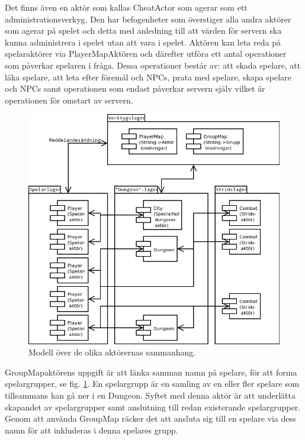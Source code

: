 \documentclass[a4paper]{article}
\begin{document}
Det finns även en aktör som kallas CheatActor som agerar som ett administrationsverkyg. Den har befogenheter som överstiger alla andra aktörer som agerar på spelet och detta med anledning till att värden för servern ska kunna administrera i spelet utan att vara i spelet. Aktören kan leta reda på spelaraktörer via PlayerMapAktören och därefter utföra ett antal operationer som påverkar spelaren i fråga. Dessa operationer består av: att skada spelare, att läka spelare, att leta efter föremål och NPCs, prata med spelare, skapa spelare och NPCs samt operationen som endast påverkar servern själv vilket är operationen för omstart av servern.    

\begin{figure}[hbt]
\centering
\includegraphics[width=1.0\textwidth]{serverActorModel2-2}
\caption{\label{fig:ServerActorModel}Modell över de olika aktörernas sammanhang.}
\end{figure}

GroupMapaktörens uppgift är att länka samman namn på spelare, för att forma spelargrupper, se fig. \ref{fig:ServerActorModel}. En spelargrupp är en samling av en eller fler spelare som tillsammans kan gå ner i en Dungeon. Syftet med denna aktör är att underlätta skapandet av spelargrupper samt anslutning till redan existerande spelargrupper. Genom att använda GroupMap räcker det att ansluta sig till en spelare via dess namn för att inkluderas i denna spelares grupp.
\end{document}
